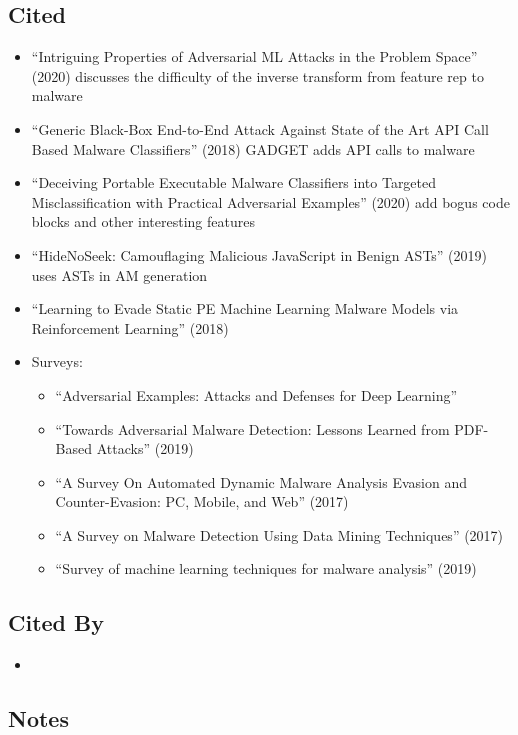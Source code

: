 \documentclass{article}
\begin{document}
\subsection*{Cited}
\begin{itemize}
	\item ``Intriguing Properties of Adversarial ML Attacks in the Problem Space'' (2020) discusses the difficulty of the inverse transform from feature rep to malware
	\item ``Generic Black-Box End-to-End Attack Against State of the Art API Call Based Malware Classifiers'' (2018) GADGET adds API calls to malware
	\item ``Deceiving Portable Executable Malware Classifiers into Targeted Misclassification with Practical Adversarial Examples'' (2020) add bogus code blocks and other interesting features
	\item ``HideNoSeek: Camouflaging Malicious JavaScript in Benign ASTs'' (2019) uses ASTs in AM generation
	\item ``Learning to Evade Static PE Machine Learning Malware Models via Reinforcement Learning'' (2018)
	\item Surveys:
	\begin{itemize}
		\item ``Adversarial Examples: Attacks and Defenses for Deep Learning''
		\item ``Towards Adversarial Malware Detection: Lessons Learned from PDF-Based Attacks'' (2019)
		\item ``A Survey On Automated Dynamic Malware Analysis Evasion and Counter-Evasion: PC, Mobile, and Web'' (2017)
		\item ``A Survey on Malware Detection Using Data Mining Techniques'' (2017)
		\item ``Survey of machine learning techniques for malware analysis'' (2019)
	\end{itemize}
\end{itemize}

\subsection*{Cited By}
\begin{itemize}
\item
\end{itemize}

\subsection*{Notes}
\end{document}
